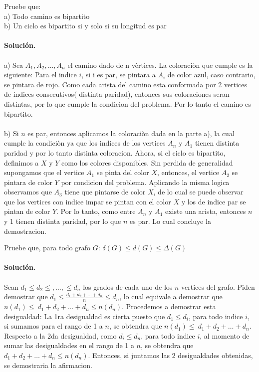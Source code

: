 \documentclass[12pt]{article}
\newenvironment{ejercicio}[2][Ejercicio]{\begin{trivlist}
\item[\hskip \labelsep {\bfseries #1}\hskip \labelsep {\bfseries #2.}]}{\end{trivlist}}
\begin{document}
\begin{ejercicio}{1.1.3}
\end{ejercicio}
Pruebe que:
\\
a) Todo camino es bipartito \\
b) Un ciclo es bipartito si y solo si su longitud es par \\\\
\textbf{Solución.} 
\\\\
a) Sea $A_1, A_2, \ldots, A_n$ el camino dado de n vèrtices. La coloraciòn que cumple es la siguiente:
Para el indice $i$, si i es par, se pintara a $A_i$ de color azul, caso contrario, se pintara de rojo.
Como cada arista del camino esta conformada por 2 vertices de indices consecutivos( distinta paridad), entonces sus coloraciones seran distintas, por lo que cumple la condicion del problema. Por lo tanto el camino es bipartito.
\\\\
b) Si $n$ es par, entonces aplicamos la coloraciòn dada en la parte a), la cual cumple la condiciòn ya que los indices de los vertices $A_n$ y $A_1$ tienen distinta paridad y por lo tanto distinta coloracion.
Ahora, si el ciclo es bipartito, definimos a $X$ y $Y$ como los colores disponibles. Sin perdida de generalidad supongamos que el vertice $A_1$ se pinta del color $X$, entonces, el vertice $A_2$ se pintara de color $Y$ por condicion del problema. Aplicando la misma logica observamos que $A_3$ tiene que pintarse de color $X$, de lo cual se puede observar que los vertices con indice impar se pintan con el color $X$ y los de indice par se pintan de color $Y$. Por lo tanto, como entre $A_n$ y $A_1$ existe una arista, entonces $n$ y 1 tienen distinta paridad, por lo que $n$ es par. Lo cual concluye la demostracion.

\begin{ejercicio}{1.1.4}
\end{ejercicio}
Pruebe que, para todo grafo $G$: $\delta(G) \leq d(G) \leq \Delta(G)$ \\\\
\textbf{Solución.} 
\\\\
Sean $d_1 \leq d_2 \leq , \ldots, \leq d_n$ los grados de cada uno de los $n$ vertices del grafo.
Piden demostrar que $d_1 \leq \frac{d_1 + d_2 + \ldots + d_n}{n}  \leq  d_n$, lo cual equivale a demostrar que $n(d_{1}) \leq \  d_1 + d_2 + \ldots + d_n  \leq  n(d_n)$. Procedemos a demostrar esta desigualdad:
La 1ra desigualdad es cierta puesto que $ d_1 \leq d_i$, para todo indice $i$, si sumamos para el rango de 1 a $n$, se obtendra que $n(d_{1}) \leq \  d_1 + d_2 + \ldots + d_n$. Respecto a la 2da desigualdad, como $ d_i \leq d_n$, para todo indice $i$, al momento de sumar las desigualdades en el rango de 1 a $n$, se obtendra que   $d_1 + d_2 + \ldots + d_n  \leq  n(d_n)$. Entonces, si juntamos las 2 desigualdades obtenidas, se demostraria la afirmacion.
\end{document}
